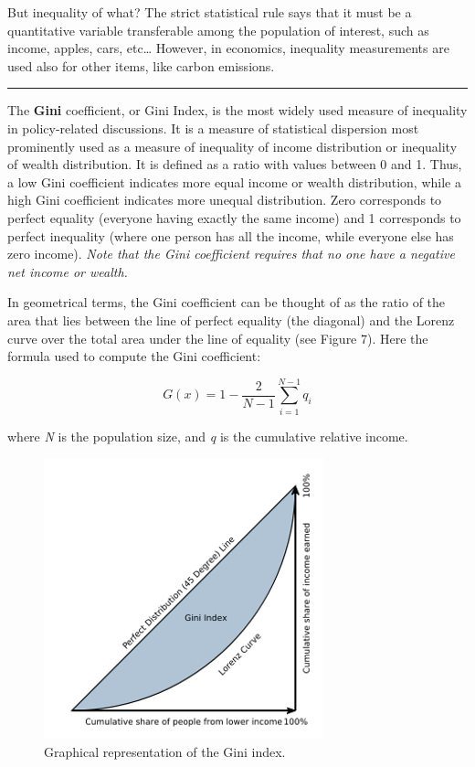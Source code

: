 \documentclass[
]{article}
\begin{document}
But inequality of what? The strict statistical rule says that it must be
a quantitative variable transferable among the population of interest,
such as income, apples, cars, etc\ldots{} However, in economics, inequality
measurements are used also for other items, like carbon emissions.

\begin{center}\rule{0.5\linewidth}{0.5pt}\end{center}

The \textbf{Gini} coefficient, or Gini Index, is the most widely used measure
of inequality in policy-related discussions. It is a measure of
statistical dispersion most prominently used as a measure of inequality
of income distribution or inequality of wealth distribution. It is
defined as a ratio with values between 0 and 1. Thus, a low Gini
coefficient indicates more equal income or wealth distribution, while a
high Gini coefficient indicates more unequal distribution. Zero
corresponds to perfect equality (everyone having exactly the same
income) and 1 corresponds to perfect inequality (where one person has
all the income, while everyone else has zero income). \emph{Note that the
Gini coefficient requires that no one have a negative net income or
wealth.}

In geometrical terms, the Gini coefficient can be thought of as the
ratio of the area that lies between the line of perfect equality (the
diagonal) and the Lorenz curve over the total area under the line of
equality (see Figure 7). Here the formula used to compute the Gini
coefficient:

\begin{equation}
G(x)=1-\frac{2}{N-1}\sum^{N-1}_{i=1}{q_i}
\label{eq:gini}
\end{equation}

where \emph{N} is the population size, and \emph{q} is the cumulative relative
income.

\begin{figure}[H]

{\centering \includegraphics[width=0.5\linewidth,]{images/gini} 

}

\caption{Graphical representation of the Gini index.}\label{fig:unnamed-chunk-42}
\end{figure}
\end{document}
